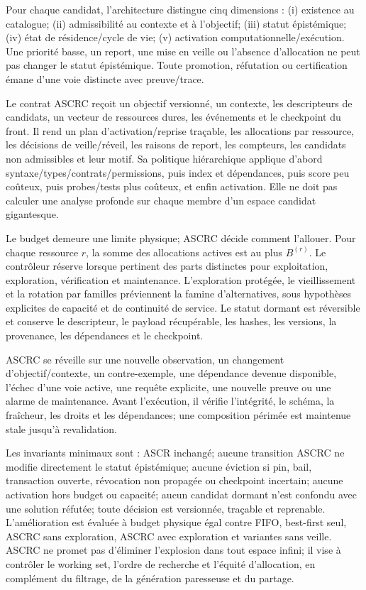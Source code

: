 \documentclass[11pt,a4paper]{article}
\begin{document}
Pour chaque candidat, l'architecture distingue cinq dimensions : (i) existence au catalogue; (ii) admissibilité au contexte et à l'objectif; (iii) statut épistémique; (iv) état de résidence/cycle de vie; (v) activation computationnelle/exécution. Une priorité basse, un report, une mise en veille ou l'absence d'allocation ne peut pas changer le statut épistémique. Toute promotion, réfutation ou certification émane d'une voie distincte avec preuve/trace.

Le contrat ASCRC reçoit un objectif versionné, un contexte, les descripteurs de candidats, un vecteur de ressources dures, les événements et le checkpoint du front. Il rend un plan d'activation/reprise traçable, les allocations par ressource, les décisions de veille/réveil, les raisons de report, les compteurs, les candidats non admissibles et leur motif. Sa politique hiérarchique applique d'abord syntaxe/types/contrats/permissions, puis index et dépendances, puis score peu coûteux, puis probes/tests plus coûteux, et enfin activation. Elle ne doit pas calculer une analyse profonde sur chaque membre d'un espace candidat gigantesque.

Le budget demeure une limite physique; ASCRC décide comment l'allouer. Pour chaque ressource $r$, la somme des allocations actives est au plus $B^{(r)}$. Le contrôleur réserve lorsque pertinent des parts distinctes pour exploitation, exploration, vérification et maintenance. L'exploration protégée, le vieillissement et la rotation par familles préviennent la famine d'alternatives, sous hypothèses explicites de capacité et de continuité de service. Le statut dormant est réversible et conserve le descripteur, le payload récupérable, les hashes, les versions, la provenance, les dépendances et le checkpoint.

ASCRC se réveille sur une nouvelle observation, un changement d'objectif/contexte, un contre-exemple, une dépendance devenue disponible, l'échec d'une voie active, une requête explicite, une nouvelle preuve ou une alarme de maintenance. Avant l'exécution, il vérifie l'intégrité, le schéma, la fraîcheur, les droits et les dépendances; une composition périmée est maintenue stale jusqu'à revalidation.

Les invariants minimaux sont : ASCR inchangé; aucune transition ASCRC ne modifie directement le statut épistémique; aucune éviction si pin, bail, transaction ouverte, révocation non propagée ou checkpoint incertain; aucune activation hors budget ou capacité; aucun candidat dormant n'est confondu avec une solution réfutée; toute décision est versionnée, traçable et reprenable. L'amélioration est évaluée à budget physique égal contre FIFO, best-first seul, ASCRC sans exploration, ASCRC avec exploration et variantes sans veille. ASCRC ne promet pas d'éliminer l'explosion dans tout espace infini; il vise à contrôler le working set, l'ordre de recherche et l'équité d'allocation, en complément du filtrage, de la génération paresseuse et du partage.
\end{document}
